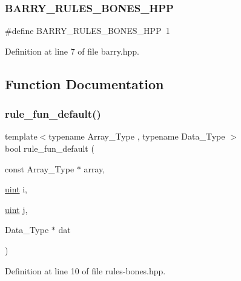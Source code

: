 \subsubsection{\texorpdfstring{B\+A\+R\+R\+Y\+\_\+\+R\+U\+L\+E\+S\+\_\+\+B\+O\+N\+E\+S\+\_\+\+H\+PP}{BARRY\_RULES\_BONES\_HPP}}
{\footnotesize\ttfamily \#define B\+A\+R\+R\+Y\+\_\+\+R\+U\+L\+E\+S\+\_\+\+B\+O\+N\+E\+S\+\_\+\+H\+PP~1}



Definition at line 7 of file barry.\+hpp.



\subsection{Function Documentation}
\mbox{\label{rules-bones_8hpp_aaeb0527576529579dd4cb51cb3ba73e0}} 
\subsubsection{\texorpdfstring{rule\+\_\+fun\+\_\+default()}{rule\_fun\_default()}}
{\footnotesize\ttfamily template$<$typename Array\+\_\+\+Type , typename Data\+\_\+\+Type $>$ \\
bool rule\+\_\+fun\+\_\+default (\begin{DoxyParamCaption}\item[{const Array\+\_\+\+Type $\ast$}]{array,  }\item[{\hyperlink{typedefs_8hpp_a91ad9478d81a7aaf2593e8d9c3d06a14}{uint}}]{i,  }\item[{\hyperlink{typedefs_8hpp_a91ad9478d81a7aaf2593e8d9c3d06a14}{uint}}]{j,  }\item[{Data\+\_\+\+Type $\ast$}]{dat }\end{DoxyParamCaption})}



Definition at line 10 of file rules-\/bones.\+hpp.

